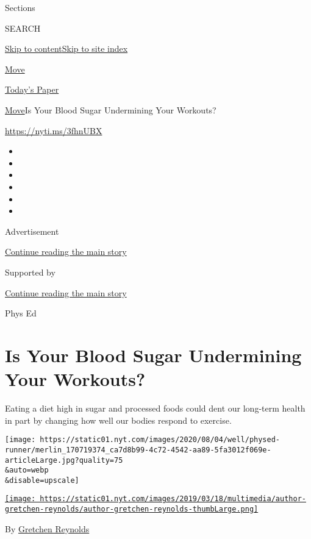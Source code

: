 Sections

SEARCH

\protect\hyperlink{site-content}{Skip to
content}\protect\hyperlink{site-index}{Skip to site index}

\href{https://www.nytimes.com/section/well/move}{Move}

\href{https://myaccount.nytimes.com/auth/login?response_type=cookie\&client_id=vi}{}

\href{https://www.nytimes.com/section/todayspaper}{Today's Paper}

\href{/section/well/move}{Move}\textbar{}Is Your Blood Sugar Undermining
Your Workouts?

\url{https://nyti.ms/3fhnUBX}

\begin{itemize}
\item
\item
\item
\item
\item
\item
\end{itemize}

Advertisement

\protect\hyperlink{after-top}{Continue reading the main story}

Supported by

\protect\hyperlink{after-sponsor}{Continue reading the main story}

Phys Ed

\hypertarget{is-your-blood-sugar-undermining-your-workouts}{%
\section{Is Your Blood Sugar Undermining Your
Workouts?}\label{is-your-blood-sugar-undermining-your-workouts}}

Eating a diet high in sugar and processed foods could dent our long-term
health in part by changing how well our bodies respond to exercise.

\texttt{[image: https://static01.nyt.com/images/2020/08/04/well/physed-runner/merlin\_170719374\_ca7d8b99-4c72-4542-aa89-5fa3012f069e-articleLarge.jpg?quality=75\\\&auto=webp\\\&disable=upscale]}

\href{https://www.nytimes.com/by/gretchen-reynolds}{\texttt{[image: https://static01.nyt.com/images/2019/03/18/multimedia/author-gretchen-reynolds/author-gretchen-reynolds-thumbLarge.png]}}

By \href{https://www.nytimes.com/by/gretchen-reynolds}{Gretchen
Reynolds}

